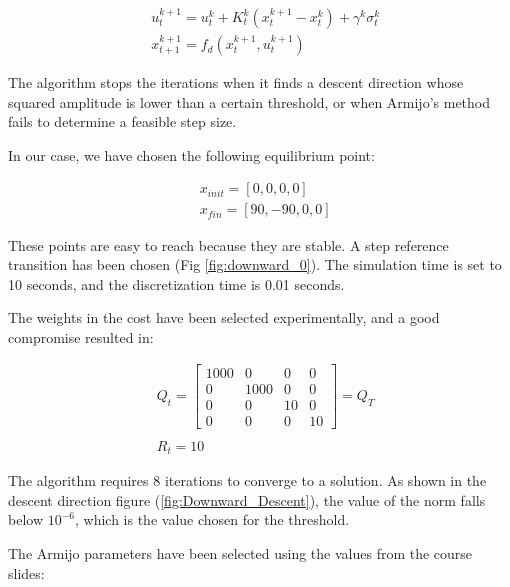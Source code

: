 \begin{equation}
    \begin{aligned}
        &u_t^{k+1} = u_t^{k} + K_t^k(x_t^{k+1}-x_t^k) + \gamma^k\sigma_t^k\\
        & x_{t+1}^{k+1} = f_d(x_t^{k+1},u_t^{k+1})        
    \end{aligned}
\end{equation}

The algorithm stops the iterations when it finds a descent direction whose squared amplitude is lower than a certain threshold, or when Armijo's method fails to determine a feasible step size.

In our case, we have chosen the following equilibrium point:

\begin{equation*}
\begin{aligned}
    &x_{init} = [0,0,0,0] \\
    &x_{fin} = [90,-90,0,0]
\end{aligned}  
\end{equation*}

These points are easy to reach because they are stable. A step reference transition has been chosen (Fig \ref{fig:downward_0}). The simulation time is set to 10 seconds, and the discretization time is 0.01 seconds. 

The weights in the cost have been selected experimentally, and a good compromise resulted in:

\begin{equation*}
    \begin{aligned}
        &Q_t = \begin{bmatrix}
            1000 & 0 & 0 & 0 \\
            0 & 1000 & 0 & 0 \\
            0 & 0 & 10 & 0\\
            0 & 0 & 0 & 10
        \end{bmatrix} = Q_T\\
        &\\
    & R_t = 10
    \end{aligned}
\end{equation*}

The algorithm requires 8 iterations to converge to a solution. As shown in the descent direction figure (\ref{fig:Downward_Descent}), the value of the norm falls below $10^{-6}$, which is the value chosen for the threshold.

The Armijo parameters have been selected using the values from the course slides:


